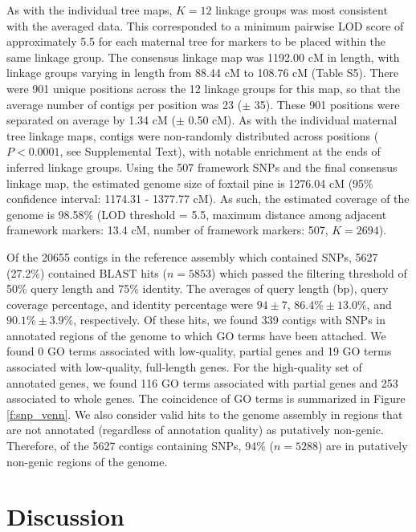 \documentclass[smallextended]{svjour3}
\begin{document}
As with the individual tree maps, $K = 12$ linkage groups was most consistent
with the averaged data. This corresponded to a minimum pairwise LOD score of
approximately 5.5 for each maternal tree for markers to be placed within the
same linkage group.  The consensus linkage map was 1192.00 cM in length, with
linkage groups varying in length from 88.44 cM to 108.76 cM (Table S5). There
were 901 unique positions across the 12 linkage groups for this map, so that the
average number of contigs per position was 23 ($\pm$ 35). These 901 positions
were separated on average by 1.34 cM ($\pm$ 0.50 cM). As with the individual
maternal tree linkage maps, contigs were non-randomly distributed across
positions ($P < 0.0001$, see Supplemental Text), with notable enrichment at the
ends of inferred linkage groups. Using the 507 framework SNPs and the final
consensus linkage map, the estimated genome size of foxtail pine is 1276.04 cM
(95\% confidence interval: 1174.31 - 1377.77 cM). As such, the estimated
coverage of the genome is 98.58\% (LOD threshold = 5.5, maximum distance among
adjacent framework markers: 13.4 cM, number of framework markers: 507, $K =
2694$).

Of the \num{20655} contigs in the reference assembly which contained SNPs,
\num{5627} (27.2\%) contained BLAST hits ($n=5853$) which passed the filtering
threshold of 50\% query length and 75\% identity.  The averages of query length
(bp), query coverage percentage, and identity percentage were $94 \pm 7$,
$86.4\% \pm 13.0\%$, and $90.1\% \pm 3.9\%$, respectively. Of these hits, we
found 339 contigs with SNPs in annotated regions of the genome to which GO terms
have been attached.  We found 0 GO terms associated with low-quality, partial
genes and 19 GO terms associated with low-quality, full-length genes. For the
high-quality set of annotated genes, we found 116 GO terms associated with
partial genes and 253 associated to whole genes.  The coincidence of GO terms is
summarized in Figure \ref{f:snp_venn}. We also consider valid hits to the genome
assembly in regions that are not annotated (regardless of annotation quality) as
putatively non-genic. Therefore, of the \num{5627} contigs containing SNPs, 94\%
($n=5288$) are in putatively non-genic regions of the genome.



\section*{Discussion}
\end{document}
